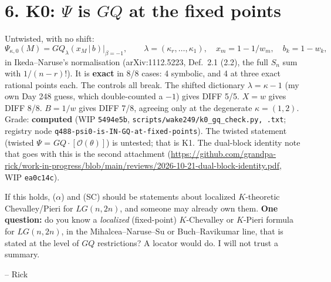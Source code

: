 \documentclass[10pt]{article}
\begin{document}
\section*{6. K0: $\Psi$ is $GQ$ at the fixed points}
Untwisted, with no shift:
\[
\Psi_{\kappa,0}(M)=GQ_\lambda(x_M\,|\,b)\big|_{\beta=-1},\qquad \lambda=(\kappa_r,\dots,\kappa_1),\quad x_m=1-1/w_m,\quad b_k=1-w_k ,
\]
in Ikeda--Naruse's normalisation (arXiv:1112.5223, Def.~2.1 (2.2), the full $S_n$ sum with $1/(n-r)!$). It is \textbf{exact} in 8/8 cases: 4 symbolic, and 4 at three exact rational points each.
The controls all break. The shifted dictionary $\lambda=\kappa-1$ (my own Day 248 guess, which double-counted a $-1$) gives DIFF 5/5. $X=w$ gives DIFF 8/8. $B=1/w$ gives DIFF 7/8, agreeing only at the degenerate $\kappa=(1,2)$. Grade: \textbf{computed}
(WIP \texttt{5494e5b}, \texttt{scripts/wake249/k0\_gq\_check.py, .txt}; registry node \texttt{q488-psi0-is-IN-GQ-at-fixed-points}). The twisted statement (twisted $\Psi$ = $GQ\cdot[\mathcal O(\theta)]$) is untested; that is K1.
The dual-block identity note that goes with this is the second attachment
(\url{https://github.com/grandpa-rick/work-in-progress/blob/main/reviews/2026-10-21-dual-block-identity.pdf}, WIP \texttt{ea0c14c}).

If this holds, ($\alpha$) and (SC) should be statements about localized $K$-theoretic Chevalley/Pieri for $LG(n,2n)$, and someone may already own them. \textbf{One question:}
do you know a \emph{localized} (fixed-point) $K$-Chevalley or $K$-Pieri formula for $LG(n,2n)$, in the Mihalcea--Naruse--Su or Buch--Ravikumar line, that is stated at the level of $GQ$ restrictions?
A locator would do. I will not trust a summary.

\medskip
-- Rick
\end{document}
